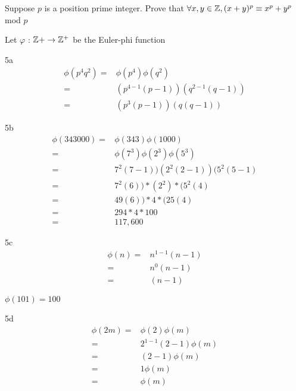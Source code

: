 \begin{question}{4}
Suppose $p$ is a position prime integer. Prove that $\forall x,y \in \mathbb{Z}, (x+y)^p \equiv x^p + y^p$ mod $p$
\end{question}


\begin{question}{5}
Let $\varphi$ : $\mathbb{Z}+ \rightarrow \mathbb{Z}^+$ be the Euler-phi function
\end{question}


\begin{question}{5a}
\begin{align*}
\phi(p^4q^2) =& \phi(p^4)\phi(q^2)\\
=& (p^{4-1}(p-1))(q^{2-1}(q-1))\\
=& (p^{3}(p-1))(q(q-1))
\end{align*}
\end{question}

\begin{question}{5b}
\begin{align*}
\phi(343000) =& \phi(343)\phi(1000)\\
=& \phi(7^3)\phi(2^3)\phi(5^3)\\
=& 7^2(7-1)) (2^2(2-1)) (5^2(5-1)\\
=& 7^2(6))*(2^2)*(5^2(4)\\
=& 49(6))*4*(25(4)\\
=& 294*4*100\\
=& 117,600
\end{align*}
\end{question}

\begin{question}{5c}
\begin{align*}
\phi(n) =& n^{1-1}(n-1)\\
=& n^{0}(n-1)\\
=& (n-1)
\end{align*}

$\phi(101)=100$
\end{question}

\begin{question}{5d}
\begin{align*}
\phi(2m) =& \phi(2) \phi(m)\\
=& 2^{1-1}(2-1) \phi(m)\\
=& (2-1) \phi(m)\\
=& 1\phi(m)\\
=& \phi(m)\\
\end{align*}
\end{question}





